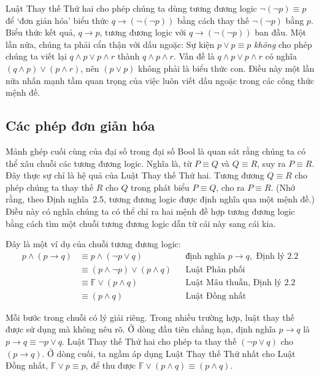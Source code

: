 Luật Thay thế Thứ hai cho phép chúng ta dùng tương đương logic $\lnot(\lnot p) \equiv p$ để `đơn giản hóa' biểu thức $q \to (\lnot(\lnot p))$ bằng cách thay thế $\lnot(\lnot p)$ bằng $p$. Biểu thức kết quả, $q \to p$, tương đương logic với $q \to (\lnot(\lnot p))$ ban đầu. Một lần nữa, chúng ta phải cẩn thận với dấu ngoặc: Sự kiện $p \lor p \equiv p$ \emph{không} cho phép chúng ta viết lại $q \land p \lor p \land r$ thành $q \land p \land r$. Vấn đề là $q \land p \lor p \land r$ có nghĩa $(q \land p) \lor (p \land r)$, nên $(p \lor p)$ không phải là biểu thức con. Điều này một lần nữa nhấn mạnh tầm quan trọng của việc luôn viết dấu ngoặc trong các công thức mệnh đề.

\subsection{Các phép đơn giản hóa}

Mảnh ghép cuối cùng của đại số trong đại số Bool là quan sát rằng chúng ta có thể xâu chuỗi các tương đương logic. Nghĩa là, từ $P \equiv Q$ và $Q \equiv R$, suy ra $P \equiv R$. Đây thực sự chỉ là hệ quả của Luật Thay thế Thứ hai. Tương đương $Q \equiv R$ cho phép chúng ta thay thế $R$ cho $Q$ trong phát biểu $P \equiv Q$, cho ra $P \equiv R$. (Nhớ rằng, theo Định nghĩa~2.5, tương đương logic được định nghĩa qua một mệnh đề.) Điều này có nghĩa chúng ta có thể chỉ ra hai mệnh đề hợp tương đương logic bằng cách tìm một chuỗi tương đương logic dẫn từ cái này sang cái kia.

Đây là một ví dụ của chuỗi tương đương logic:
\begin{align*}
p \land (p \to q) &\equiv p \land (\lnot p \lor q) && \text{định nghĩa } p \to q, \text{ Định lý 2.2} \\
&\equiv (p \land \lnot p) \lor (p \land q) && \text{Luật Phân phối} \\
&\equiv \mathbb{F} \lor (p \land q) && \text{Luật Mâu thuẫn, Định lý 2.2} \\
&\equiv (p \land q) && \text{Luật Đồng nhất}
\end{align*}

Mỗi bước trong chuỗi có lý giải riêng. Trong nhiều trường hợp, luật thay thế được sử dụng mà không nêu rõ. Ở dòng đầu tiên chẳng hạn, định nghĩa $p \to q$ là $p \to q \equiv \lnot p \lor q$. Luật Thay thế Thứ hai cho phép ta thay thế $(\lnot p \lor q)$ cho $(p \to q)$. Ở dòng cuối, ta ngầm áp dụng Luật Thay thế Thứ nhất cho Luật Đồng nhất, $\mathbb{F} \lor p \equiv p$, để thu được $\mathbb{F} \lor (p \land q) \equiv (p \land q)$.

